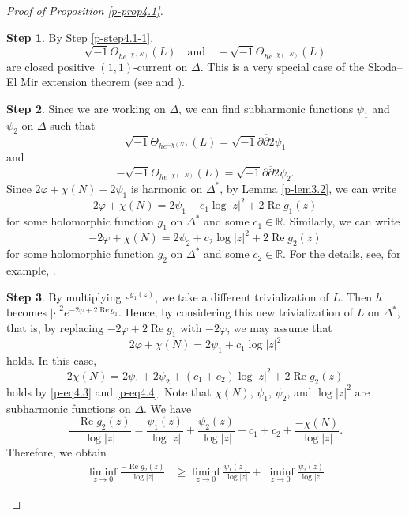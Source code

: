 \documentclass[12pt,twoside]{amsart}
\DeclareMathOperator{\re}{Re}
\theoremstyle{definition}
\newtheorem{step}{Step}
\begin{document}
\begin{proof}[Proof of Proposition \ref{p-prop4.1}]
\begin{step}
By Step \ref{p-step4.1-1}, 
\[ 
\sqrt{-1}\Theta_{he^{-\chi(N)}}(L)\quad \text{and}
\quad  
-\sqrt{-1}\Theta_{he^{-\chi(-N)}}(L)
\] are closed 
positive $(1, 1)$-current on $\Delta$. 
This is a very special case of the Skoda--El Mir extension theorem 
(see \cite[(1.18) Theorem]{demailly1} and \cite[Chapter III, \S 2.A]{demailly}). 
\end{step}
\begin{step}\label{p-step4.1-4}
Since we are working on $\Delta$, 
we can find subharmonic functions $\psi_1$ and $\psi_2$ 
on $\Delta$ such that 
\[
\sqrt{-1} \Theta _{he^{-\chi(N)}}(L)=\sqrt{-1} \partial 
\overline \partial 2\psi_1
\] 
and 
\[
-\sqrt{-1} \Theta _{he^{-\chi(-N)}}(L)=\sqrt{-1} \partial 
\overline \partial 2\psi_2. 
\] 
Since $2\varphi+\chi (N)-2\psi_1$ is harmonic 
on $\Delta^*$, by Lemma \ref{p-lem3.2}, 
we can write 
\begin{equation}\label{p-eq4.2}
2\varphi +\chi (N)=2\psi_1+c_1\log |z|^2+2\re g_1(z)
\end{equation}
for some holomorphic 
function $g_1$ on $\Delta^*$ and 
some $c_1\in \mathbb R$. 
Similarly, we can write 
\begin{equation}\label{p-eq4.3}
-2\varphi +\chi (N)=2\psi_2+c_2\log |z|^2+2\re g_2(z)
\end{equation}
for some holomorphic function $g_2$ on $\Delta^*$ and 
some $c_2\in \mathbb R$. 
For the details, see, for example, \cite[Chapter III, \S1.C]{demailly}. 
\end{step}
\begin{step}\label{p-step4.1-5}
By multiplying $e^{g_1(z)}$, 
we take a different trivialization of $L$. 
Then $h$ becomes $|\cdot |^2e^{-2\varphi+2\re g_1}$. 
Hence, by considering this new trivialization of $L$ on 
$\Delta^*$, that is, by replacing 
$-2\varphi+2\re g_1$ with $-2\varphi$, we may assume that 
\begin{equation}\label{p-eq4.4}
2\varphi +\chi(N)=2\psi_1+c_1\log |z|^2
\end{equation} 
holds. In this case, 
\[
2\chi (N)=2\psi_1+2\psi_2+(c_1+c_2)\log |z|^2+2\re g_2(z) 
\] 
holds by \eqref{p-eq4.3} and \eqref{p-eq4.4}. 
Note that $\chi(N)$, $\psi_1$, $\psi_2$, and $\log |z|^2$ are subharmonic 
functions on $\Delta$. 
We have 
\[
\frac{-\re g_2(z)}{\log |z|}=\frac{\psi_1(z)}{\log |z|}
+\frac{\psi_2(z)}{\log |z|}+c_1+c_2
+\frac{-\chi(N)}{\log|z|}. 
\] 
Therefore, we obtain 
\[
\begin{split}
\liminf_{z\to 0}\frac{-\re g_2(z)}{\log |z|}&\geq 
\liminf_{z\to 0}\frac{\psi_1(z)}{\log |z|}
+\liminf_{z\to 0}\frac{\psi_2(z)}{\log |z|}

\end{split}\]
\end{step}
\end{proof}
\end{document}
